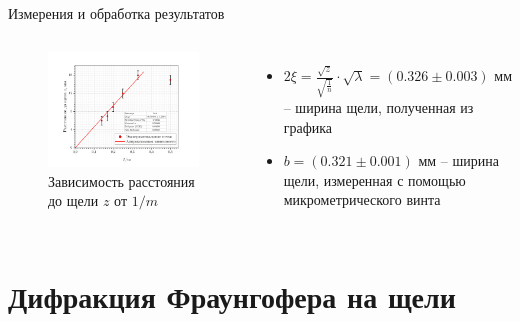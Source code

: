 \documentclass[11pt]{beamer} %
\begin{document}
    \begin{frame}{Измерения и обработка результатов}
         \begin{columns}
            \begin{figure}[H]
            \centering
                \includegraphics[width = \textwidth]{images/graph_a.png}
                \caption{Зависимость расстояния до щели $z$ от $1/m$}
            \end{figure}

            \begin{itemize}
                \item $2 \xi = \frac{\sqrt{z}}{\sqrt{\frac{1}{n}}} \cdot \sqrt{\lambda} = \left( 0.326 \pm 0.003 \right) \text{ мм}$ -- ширина щели, полученная из графика
                \item $b = \left( 0.321 \pm 0.001 \right) \text{ мм}$ -- ширина щели, измеренная с помощью микрометрического винта
            \end{itemize}
        \end{columns}
    \end{frame}

    \section{Дифракция Фраунгофера на щели}
\end{document}
